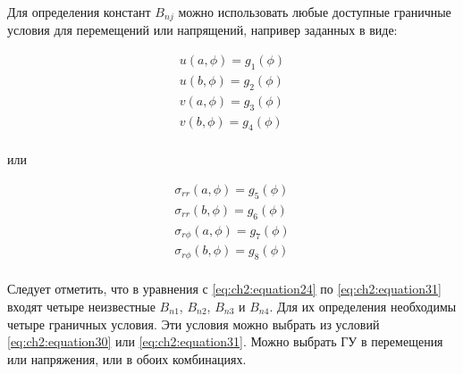 Для определения констант \(B_{nj}\) можно использовать любые доступные граничные условия для перемещений или напрящений, напривер заданных в виде:

\begin{equation}
\label{eq:ch2:equation30}
\begin{split}
	u(a, \phi) = g_1 (\phi) \\
	u(b, \phi) = g_2 (\phi) \\
	v(a, \phi) = g_3 (\phi) \\
	v(b, \phi) = g_4 (\phi) \\
\end{split}
\end{equation}

или

\begin{equation}
\label{eq:ch2:equation31}
\begin{split}
	\sigma_{rr}(a, \phi) = g_5 (\phi) \\
	\sigma_{rr}(b, \phi) = g_6 (\phi) \\
	\sigma_{r\phi}(a, \phi) = g_7 (\phi) \\
	\sigma_{r\phi}(b, \phi) = g_8 (\phi) \\
\end{split}
\end{equation}

Следует отметить, что в уравнения с \cref{eq:ch2:equation24} по \cref{eq:ch2:equation31} входят четыре неизвестные \(B_{n1}\), \(B_{n2}\), \(B_{n3}\) и \(B_{n4}\). Для их определения необходимы четыре граничных условия. Эти условия можно выбрать из условий \cref{eq:ch2:equation30} или \cref{eq:ch2:equation31}. Можно выбрать ГУ в перемещения или напряжения, или в обоих комбинациях.